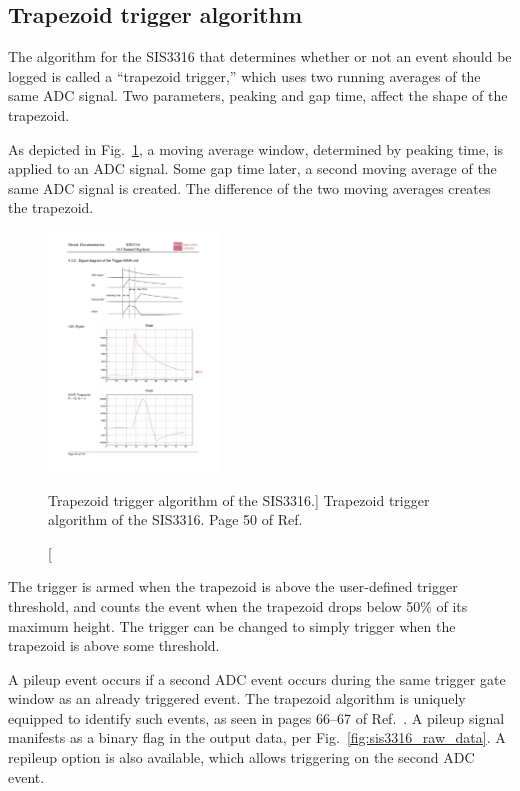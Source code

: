 
\subsection{Trapezoid trigger algorithm}


The algorithm for the SIS3316 that determines whether or not an event should be logged is called a ``trapezoid trigger,'' which uses two running averages of the same ADC signal. Two parameters, peaking and gap time, affect the shape of the trapezoid.

As depicted in Fig.~\ref{fig:sis3316_trapezoid}, a moving average window, determined by peaking time, is applied to an ADC signal. Some gap time later, a second moving average of the same ADC signal is created. The difference of the two moving averages creates the trapezoid.


\begin{figure}
    \centering
    \includegraphics[height=2.5in]{figures/sis3316_trapezoid.pdf}
    \caption
    [Trapezoid trigger algorithm of the SIS3316.]
     {Trapezoid trigger algorithm of the SIS3316. Page 50 of Ref.~\cite{sis3316_manual}}
    \label{fig:sis3316_trapezoid}
\end{figure}

The trigger is armed when the trapezoid is above the user-defined trigger threshold, and counts the event when the trapezoid drops below 50\% of its maximum height. The trigger can be changed to simply trigger when the trapezoid is above some threshold.

A pileup event occurs if a second ADC event occurs during the same trigger gate window as an already triggered event. The trapezoid algorithm is uniquely equipped to identify such events, as seen in pages 66--67 of Ref.~\cite{sis3316_manual}. A pileup signal manifests as a binary flag in the output data, per Fig.~\ref{fig:sis3316_raw_data}. A repileup option is also available, which allows triggering on the second ADC event.


